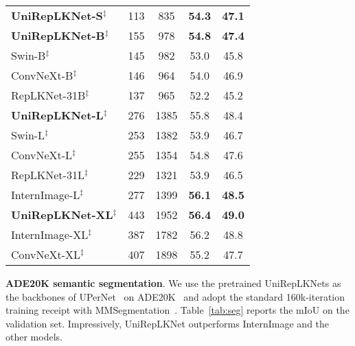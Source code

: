 \documentclass[10pt,twocolumn,letterpaper]{article}
\begin{document}
\begin{table}[t]
\begin{tabular}{l|c|c|c|c}
    \hline
    \rowcolor{gray!20}
    \textbf{UniRepLKNet-S}$^\ddagger$      &   113  &   835   &   \textbf{54.3}      &     \textbf{47.1}   \\
    \rowcolor{gray!20}
    \textbf{UniRepLKNet-B}$^\ddagger$      &   155  &   978   &    \textbf{54.8}    &   \textbf{47.4}   \\
    Swin-B$^\ddagger$~\cite{liu2021swin}      &   145   &   982     &   53.0    &   45.8    \\
    ConvNeXt-B$^\ddagger$~\cite{liu2022convnet}  &   146   &   964     &   54.0    &   46.9    \\
    RepLKNet-31B$^\ddagger$~\cite{ding2022scaling} &   137 &   965 &52.2   &   45.2    \\
    \hline
    \rowcolor{gray!20}
    \textbf{UniRepLKNet-L}$^\ddagger$      &   276  &   1385  & {55.8}   &   {48.4}      \\
    Swin-L$^\ddagger$~\cite{liu2021swin}  &   253 &   1382    &   53.9    &   46.7    \\
    ConvNeXt-L$^\ddagger$~\cite{liu2022convnet}  &  255 &1354   &   54.8    &   47.6    \\
    RepLKNet-31L$^\ddagger$~\cite{ding2022scaling}    &   229 &1321   &   53.9    &   46.5    \\
    InternImage-L$^\ddagger$~\cite{wang2023internimage}   &   277   &   1399     &\textbf{56.1}   &   \textbf{48.5}   \\
    \hline
    \rowcolor{gray!20}
    \textbf{UniRepLKNet-XL}$^\ddagger$  &   443  &   1952   &   \textbf{56.4}    &   \textbf{49.0}   \\
    InternImage-XL$^\ddagger$~\cite{wang2023internimage}  &   387    &   1782  & 56.2 &   48.8  \\
    ConvNeXt-XL$^\ddagger$~\cite{liu2022convnet} &   407   &   1898    &   55.2    &   47.7     \\
    \hline
\end{tabular}
    \label{tab:det}
    \vspace{-0.1in}
\end{table}

 
\noindent\textbf{ADE20K semantic segmentation}. We use the pretrained UniRepLKNets as the backbones of UPerNet~\cite{xiao2018unified} on ADE20K~\cite{zhou2019semantic} and adopt the standard 160k-iteration training receipt with MMSegmentation~\cite{mmseg2020}. Table~\ref{tab:seg} reports the mIoU on the validation set. Impressively, UniRepLKNet outperforms InternImage and the other models. 
\end{document}
